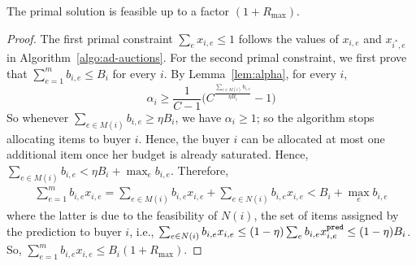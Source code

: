 \begin{lemma}	\label{lem:ad-auctions-primal-feasibility}
The primal solution is feasible up to a factor $(1 + R_{\max})$.
\end{lemma}
%
\begin{proof}
The first primal constraint $\sum_{e} x_{i,e} \leq 1$ follows the values of $x_{i,e}$ and $x_{i^{*},e}$ in Algorithm~\ref{algo:ad-auctions}.
For the second primal constraint, we first prove that $\sum_{e=1}^{m} b_{i,e} \leq  B_{i}$ for every $i$. 
By Lemma~\ref{lem:alpha}, for every $i$, 
$$
\alpha_{i} \geq \frac{1}{C - 1} \biggl( C^{\frac{\sum_{e \in M(i)} b_{i,e}}{\eta B_{i}}} - 1 \biggr)
$$
So whenever $\sum_{e \in M(i)} b_{i,e} \geq \eta B_{i}$, we have $\alpha_{i} \geq 1$; so the algorithm 
stops allocating items to buyer $i$. Hence, the buyer $i$ can be allocated at most one additional item once her budget is 
already saturated. Hence, $\sum_{e \in M(i)} b_{i,e}  < \eta B_{i} + \max_{e} b_{i,e}$. 
Therefore, 
\begin{align*}
\sum_{e=1}^{m} b_{i,e}x_{i,e} = 
\sum_{e \in M(i)} b_{i,e}x_{i,e} + \sum_{e \in N(i)} b_{i,e}x_{i,e}
<  B_{i} + \max_{e} b_{i,e}
\end{align*}
where the latter is due to the feasibility of $N(i)$, the set of items assigned by the prediction to buyer $i$,
i.e., $\sum_{e \in N(i)} b_{i,e}x_{i,e} \leq  (1 - \eta) \sum_{e} b_{i,e} x^{\texttt{pred}}_{i,e} \leq (1 - \eta) B_{i}$.
So, $\sum_{e=1}^{m} b_{i,e}x_{i,e} \leq B_{i}(1 + R_{\max})$.
\end{proof}

